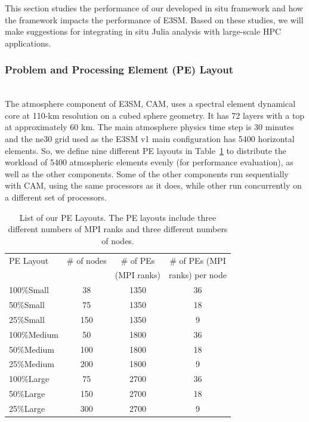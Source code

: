 \documentclass{juliacon}
\begin{document}
This section studies the performance of our developed in situ framework and how the framework impacts the performance of E3SM. Based on these studies, we will make suggestions for integrating in situ Julia analysis with large-scale HPC applications.

\subsubsection{Problem and Processing Element (PE) Layout}\hspace*{\fill} \\


The atmosphere component of E3SM, CAM, uses a spectral element dynamical core at 110-km resolution on a cubed sphere geometry. It has 72 layers with a top at approximately 60 km. The main atmosphere physics time step is 30 minutes and the ne30 grid used as the E3SM v1 main configuration has 5400 horizontal elements. So, we define nine different PE layouts in Table~\ref{table:layout} to distribute the workload of 5400 atmospheric elements evenly (for performance evaluation), as well as the other components. Some of the other components run sequentially with CAM, using the same processors as it does, while other run concurrently on a different set of processors. 




\begin{table}
  \centering
  \caption{List of our PE Layouts. The PE layouts include three different numbers of MPI ranks and three different numbers of nodes.}
  \label{table:layout}
  \begin{tabular}{lccc}
 \toprule
 PE Layout& \# of nodes  & \# of PEs  & \# of PEs (MPI   \\
 &  & (MPI ranks) &  ranks) per node \\
 \midrule
 100\%Small & 38 & 1350 & 36 \\
 50\%Small  & 75 & 1350 & 18\\
 25\%Small  & 150 & 1350 & 9\\
 100\%Medium & 50 & 1800 & 36\\
 50\%Medium  & 100 & 1800 & 18\\
 25\%Medium  & 200 & 1800 & 9\\
 100\%Large & 75 & 2700 & 36\\
 50\%Large  & 150 & 2700 & 18\\
 25\%Large  & 300 & 2700 & 9\\
 \bottomrule
\end{tabular}
\end{table}
\end{document}
